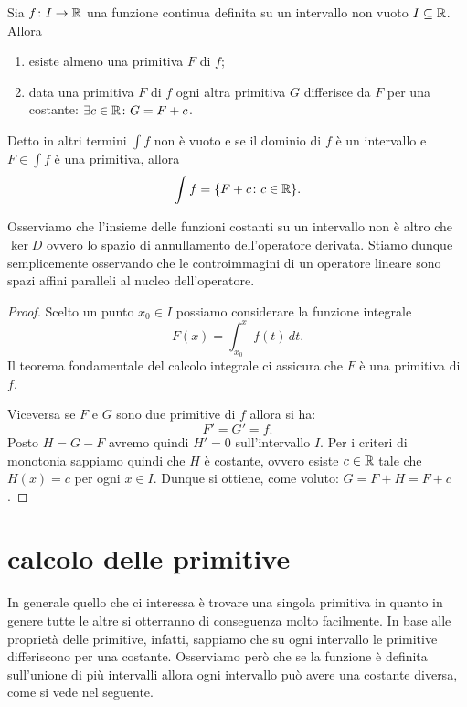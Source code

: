\begin{theorem}
\label{th:primitive}
\mymark{***}
Sia $f\colon I \to \mathbb R$
una funzione continua definita su un intervallo non vuoto $I\subseteq \mathbb R$. Allora
\begin{enumerate}
\item esiste almeno una primitiva $F$ di $f$;
\item data una primitiva $F$ di $f$ ogni altra
primitiva $G$ differisce da $F$ per una costante: $\exists c\in \mathbb R\colon G= F+c$.
\end{enumerate}

Detto in altri termini $\int f$ non è vuoto e se il dominio di $f$ è un
intervallo e
$F\in \int f$ è una primitiva, allora
\[
  \int f = \{F+c \colon c \in \mathbb R\}.
\]
\end{theorem}

Osserviamo che l'insieme delle funzioni costanti
su un intervallo
non è altro che $\ker D$ ovvero lo spazio di annullamento dell'operatore derivata.
Stiamo dunque semplicemente osservando che le controimmagini di un operatore
lineare sono spazi affini paralleli al nucleo dell'operatore.

\begin{proof}
\mymark{***}
Scelto un punto $x_0\in I$ possiamo
considerare la funzione integrale
\[
  F(x) = \int_{x_0}^x f(t)\, dt.
\]
Il teorema fondamentale del calcolo integrale
ci assicura che $F$ è una primitiva di $f$.

Viceversa se $F$ e $G$ sono due primitive di $f$ allora si ha:
\[
  F' = G' = f.
\]
Posto $H=G-F$ avremo quindi $H'=0$ sull'intervallo $I$. Per i criteri di
monotonia sappiamo quindi che $H$ è costante, ovvero esiste $c\in \mathbb R$ tale
che $H(x)=c$ per ogni $x\in I$. Dunque si ottiene, come voluto: $G=F+H=F+c$.
\end{proof}

\section{calcolo delle primitive}

In generale quello che ci interessa è trovare una singola primitiva in quanto
in genere tutte le altre si otterranno di conseguenza molto facilmente.
In base alle proprietà delle primitive, infatti, sappiamo che su ogni
intervallo le primitive differiscono per una costante. Osserviamo però
che se la funzione è definita sull'unione di più intervalli allora ogni
intervallo può avere una costante diversa, come si vede nel seguente.

